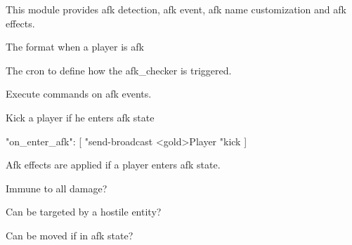 
This module provides afk detection, afk event, afk name customization and afk effects.


The  format when a player is afk

The cron to define how the afk\_checker is triggered.

Execute commands on afk events.

\begin{example}{Kick a player if he enters afk state}
    \begin{json}
        "on_enter_afk": [
        "send-broadcast <gold>Player %
        "kick %
        ]
    \end{json}
\end{example}

Afk effects are applied if a player enters afk state.

Immune to all damage?

Can be targeted by a hostile entity?

Can be moved if in afk state?













